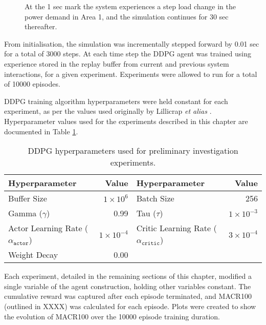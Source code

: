 \begin{figure}[h]
	\centering
	
	\caption[Preliminary investigation load demand step change]{At the 1 sec mark the system experiences a step load change in the power demand in Area 1, and the simulation continues for 30 sec thereafter.}
	\label{fig:5001_demand_profile}
\end{figure}

From initialisation, the simulation was incrementally stepped forward by 0.01 sec for a total of 3000 steps. At each time step the DDPG agent was trained using experience stored in the replay buffer from current and previous system interactions, for a given experiment. Experiments were allowed to run for a total of 10000 episodes.

DDPG training algorithm hyperparameters were held constant for each experiment, as per the values used originally by Lillicrap \textit{et alias} \cite{Lillicrap2015}. Hyperparameter values used for the experiments described in this chapter are documented in Table \ref{tab:5000_hyperparameters}.

\begin{table}[h]
	\centering
	\caption{DDPG hyperparameters used for preliminary investigation experiments.}
	\begin{tabular}{lrlr}
	\toprule
	\textbf{Hyperparameter} & \textbf{Value} & \textbf{Hyperparameter} & \textbf{Value} \\
	\midrule
	Buffer Size 	 & $1 \times 10^6$  & Batch Size 	& 256 \\
	Gamma ($\gamma$) & 0.99 	& Tau ($\tau$) 	& $1 \times 10^{-3}$ \\
	Actor Learning Rate ($\alpha_{\texttt{actor}}$) & $1 \times 10^{-4}$ & Critic Learning Rate ($\alpha_{\texttt{critic}}$) & $3 \times 10^{-4} $ \\
	Weight Decay & 0.00 & & \\
	\bottomrule
	\end{tabular}\label{tab:5000_hyperparameters}
\end{table}

Each experiment, detailed in the remaining sections of this chapter, modified a single variable of the agent construction, holding other variables constant. The cumulative reward was captured after each episode terminated, and MACR100 (outlined in XXXX) was calculated for each episode. Plots were created to show the evolution of MACR100 over the 10000 episode training duration.

